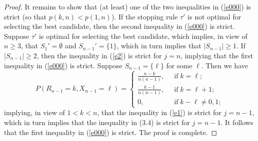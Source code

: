 \documentclass[12pt, A4paper, oneside]{article}
\theoremstyle{plain}
\numberwithin{equation}{section}
\begin{document}
\begin{proof}
It remains to show that (at least) one of the two inequalities in (\ref{e000}) is strict (so that $p(k,n)<p(1,n)$).
If the stopping rule $\tau'$ is not optimal for selecting the best candidate, then the second inequality in (\ref{e000}) is strict.
 Suppose $\tau'$ is optimal for selecting the best candidate, which implies, in view of $n \ge 3$, that $S_1'=\emptyset$
and $S_{n-1}'=\{1\}$, which in turn implies that $|S_{n-1}|\ge 1$. If $|S_{n-1}|\ge 2$, then the inequality in (\ref{e2})
is strict for $j=n$, implying that the first inequality in (\ref{e000}) is strict.
Suppose $S_{n-1}=\{\ell\}$ for some $\ell$. Then we have
\begin{equation*}
P(R_{n-1}=k, X_{n-1}=\ell)=
\begin{cases}
\frac{n-k}{n(n-1)},&\;\;\mbox{if}\;k=\ell;\\
\frac{k-1}{n(n-1)},&\;\;\mbox{if}\;k=\ell+1;\\
0,&\;\;\mbox{if}\;k-\ell\ne 0,1;
\end{cases}
\end{equation*}
implying, in view of $1<k<n$, that the inequality in (\ref{e1}) is strict for $j=n-1$, which in turn implies that the inequality in (3.4)
is strict for $j=n-1$. It follows  that the first inequality in (\ref{e000}) is strict. The proof is complete.
\end{proof}
\end{document}
